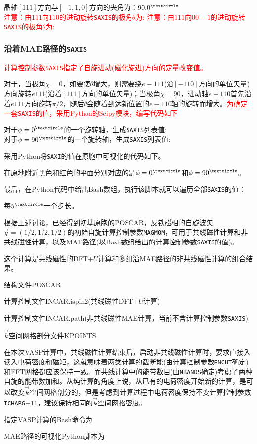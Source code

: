 晶轴$[111]$方向与$[-1,1,0]$方向的夹角为：$90.0^{\textcircle}$\\
\textcolor{red}{注意：由$111$向$110$的进动旋转\texttt{SAXIS}的极角$\theta$为:}
\textcolor{red}{注意：由$111$向$00-1$的进动旋转\texttt{SAXIS}的极角$\theta$为:}

\subsubsection{沿着\textrm{MAE}路径的\tt{SAXIS}}
\textcolor{red}{计算控制参数\texttt{SAXIS}指定了自旋进动(磁化旋进)方向的定量改变值。}

对于，当极角$\chi=0$，如要使$\theta$增大，则需要绕$e-111$(沿$[-110]$方向的单位矢量)方向旋转$e111$(沿着$[111]$方向的单位矢量)；当极角$\chi=90$，进动轴$e-110$首先沿着$e111$方向旋转$\pi/2$，随后$\theta$会随着到达新位置的$e-110$轴的旋转而增大。\textcolor{red}{为确定一套\texttt{SAXIS}的值，采用\textrm{Python}的\textrm{Scipy}模块，编写代码如下}

对于$\phi=0^{\textcircle}$的一个旋转轴，生成\texttt{SAXIS}列表值:\\
对于$\phi=90^{\textcircle}$的一个旋转轴，生成\texttt{SAXIS}列表值:

采用\textrm{Python}将\texttt{SAXI}的值在原胞中可视化的代码如下。

在原地附近黑色和红色的平面分别对应的是$\phi=0^{\textcircle}$和$\phi=90^{\textcircle}$。

最后，在\textrm{Python}代码中给出\textrm{Bash}数组，执行该脚本就可以遍历全部\texttt{SAXIS}的值：

每$5^{\textcircle}$一个步长。

根据上述讨论，已经得到初基原胞的\textrm{POSCAR}，反铁磁相的自旋波矢$\vec q=(1/2,1/2,1/2)$的初始自旋计算控制参数\texttt{MAGMOM}，可用于共线磁性计算和非共线磁性计算，以及\textrm{MAE}路径(以\textrm{Bash}数组给出的计算控制参数\texttt{SAXIS}的值)。

这个计算是共线磁性的\textrm{DFT}+$U$计算和多组沿\textrm{MAE}路径的非共线磁性计算的组合结果。

结构文件\textrm{POSCAR}

计算控制文件\textrm{INCAR.ispin2}(共线磁性\textrm{DFT+}$U$计算)

计算控制文件\textrm{INCAR.path}(非共线磁性\textrm{MAE}计算，当前不含计算控制参数\texttt{SAXIS})

$\vec k$空间网格剖分文件\textrm{KPOINTS}

在本次\textrm{VASP}计算中，共线磁性计算结束后，启动非共线磁性计算时，要求直接入读入电荷密度和磁矩，这就意味着两类计算的截断能(由计算控制参数\texttt{ENCUT}确定)和\textrm{FFT}网格都应该保持一致。而共线计算中的能带数目(由\texttt{NBANDS}确定)考虑了两种自旋的能带数加和。从纯计算的角度上说，从已有的电荷密度开始新的计算，是可以改变$\vec k$空间网格剖分的，但是考虑到计算过程中电荷密度保持不变\textrm{计算控制参数\texttt{ICHARG}=11}，建议保持相同的$\vec k$空间网格密度。

指定\textrm{VASP}计算的\textrm{Bash}命令为

\textrm{MAE}路径的可视化\textrm{Python}脚本为


